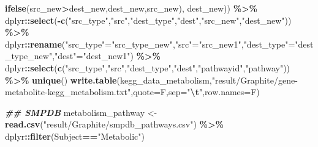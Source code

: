 \documentclass[
]{book}
\newenvironment{Shaded}{\begin{snugshade}}{\end{snugshade}}
\newcommand{\AttributeTok}[1]{\textcolor[rgb]{0.13,0.29,0.53}{#1}}
\newcommand{\DocumentationTok}[1]{\textcolor[rgb]{0.56,0.35,0.01}{\textbf{\textit{#1}}}}
\newcommand{\FunctionTok}[1]{\textcolor[rgb]{0.13,0.29,0.53}{\textbf{#1}}}
\newcommand{\NormalTok}[1]{#1}
\newcommand{\OtherTok}[1]{\textcolor[rgb]{0.56,0.35,0.01}{#1}}
\newcommand{\SpecialCharTok}[1]{\textcolor[rgb]{0.81,0.36,0.00}{\textbf{#1}}}
\newcommand{\StringTok}[1]{\textcolor[rgb]{0.31,0.60,0.02}{#1}}
\begin{document}
\begin{Shaded}
\begin{Highlighting}[]
                                 \FunctionTok{ifelse}\NormalTok{(src\_new}\SpecialCharTok{\textgreater{}}\NormalTok{dest\_new,dest\_new,src\_new),}
\NormalTok{                                 dest\_new)) }\SpecialCharTok{\%\textgreater{}\%}
\NormalTok{  dplyr}\SpecialCharTok{::}\FunctionTok{select}\NormalTok{(}\SpecialCharTok{{-}}\FunctionTok{c}\NormalTok{(}\StringTok{"src\_type"}\NormalTok{,}\StringTok{"src"}\NormalTok{,}\StringTok{"dest\_type"}\NormalTok{,}\StringTok{"dest"}\NormalTok{,}\StringTok{"src\_new"}\NormalTok{,}\StringTok{"dest\_new"}\NormalTok{)) }\SpecialCharTok{\%\textgreater{}\%}
\NormalTok{  dplyr}\SpecialCharTok{::}\FunctionTok{rename}\NormalTok{(}\StringTok{"src\_type"}\OtherTok{=}\StringTok{"src\_type\_new"}\NormalTok{,}\StringTok{"src"}\OtherTok{=}\StringTok{"src\_new1"}\NormalTok{,}\StringTok{"dest\_type"}\OtherTok{=}\StringTok{"dest\_type\_new"}\NormalTok{,}\StringTok{"dest"}\OtherTok{=}\StringTok{"dest\_new1"}\NormalTok{) }\SpecialCharTok{\%\textgreater{}\%}
\NormalTok{  dplyr}\SpecialCharTok{::}\FunctionTok{select}\NormalTok{(}\FunctionTok{c}\NormalTok{(}\StringTok{"src\_type"}\NormalTok{,}\StringTok{"src"}\NormalTok{,}\StringTok{"dest\_type"}\NormalTok{,}\StringTok{"dest"}\NormalTok{,}\StringTok{"pathwayid"}\NormalTok{,}\StringTok{"pathway"}\NormalTok{)) }\SpecialCharTok{\%\textgreater{}\%}
  \FunctionTok{unique}\NormalTok{()}
\FunctionTok{write.table}\NormalTok{(kegg\_data\_metabolism,}\StringTok{"result/Graphite/gene{-}metabolite{-}kegg\_metabolism.txt"}\NormalTok{,}\AttributeTok{quote=}\NormalTok{F,}\AttributeTok{sep=}\StringTok{"}\SpecialCharTok{\textbackslash{}t}\StringTok{"}\NormalTok{,}\AttributeTok{row.names=}\NormalTok{F)}

\DocumentationTok{\#\# SMPDB}
\NormalTok{metabolism\_pathway }\OtherTok{\textless{}{-}} \FunctionTok{read.csv}\NormalTok{(}\StringTok{"result/Graphite/smpdb\_pathways.csv"}\NormalTok{) }\SpecialCharTok{\%\textgreater{}\%}
\NormalTok{  dplyr}\SpecialCharTok{::}\FunctionTok{filter}\NormalTok{(Subject}\SpecialCharTok{==}\StringTok{"Metabolic"}\NormalTok{)}


\end{Highlighting}
\end{Shaded}
\end{document}
